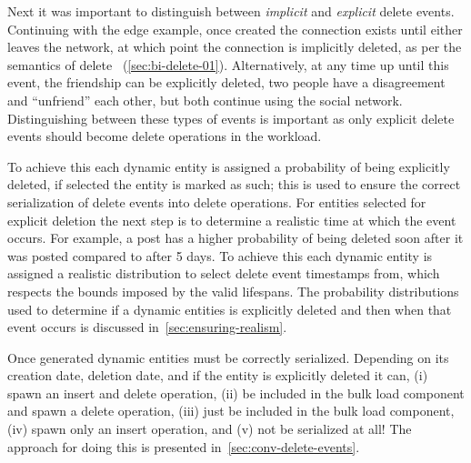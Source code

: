 Next it was important to distinguish between \emph{implicit} and \emph{explicit} delete events.
Continuing with the \tKnows edge example, once created the connection exists until either \tPerson leaves the network,
at which point the connection is implicitly deleted, as per the semantics of delete \tPerson~(\autoref{sec:bi-delete-01}).
Alternatively, at any time up until this event, the friendship can be explicitly deleted,
\ie two people have a disagreement and ``unfriend'' each other, but both continue using the social network.
Distinguishing between these types of events is important as only explicit delete events should become delete operations
in the workload.

To achieve this each dynamic entity is assigned a probability of being explicitly deleted, if selected the entity is marked as such;
this is used to ensure the correct serialization of delete events into delete operations.
For entities selected for explicit deletion the next step is to determine a realistic time at which the event occurs.
For example, a post has a higher probability of being deleted soon after it was posted compared to after 5 days.
To achieve this each dynamic entity is assigned a realistic distribution to select delete event timestamps from,
which respects the bounds imposed by the valid lifespans.
The probability distributions used to determine if a dynamic entities is explicitly deleted and then when that event occurs is discussed
in~\autoref{sec:ensuring-realism}.

Once generated dynamic entities must be correctly serialized.
Depending on its creation date, deletion date, and if the entity is explicitly deleted it can,
(i) spawn an insert and delete operation,
(ii) be included in the bulk load component and spawn a delete operation,
(iii) just be included in the bulk load component,
(iv) spawn only an insert operation, and
(v) not be serialized at all!
The approach for doing this is presented in~\autoref{sec:conv-delete-events}.

